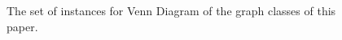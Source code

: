 \begin{figure}[htb]
\begin{tabular}{  c c c c  c}
  \end{tabular}
 \caption{The set of instances for Venn Diagram of the graph classes of this paper.}
 \label{fig:exemplosDiagram}
\end{figure}  
 



















 
    
